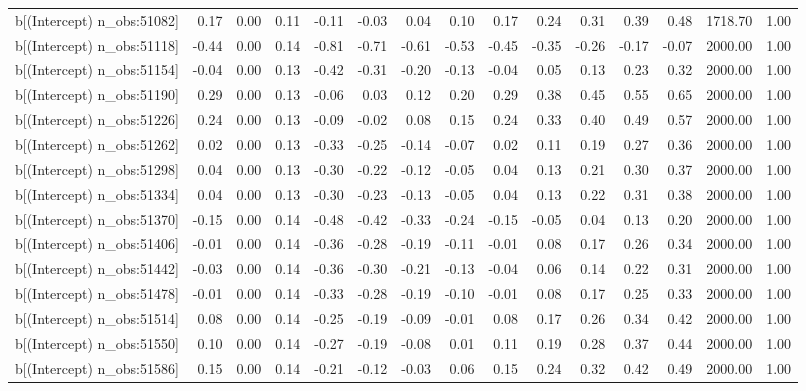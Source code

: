 \begin{table}[ht]
\begin{tabular}{rrrrrrrrrrrrrrr}
  b[(Intercept) n\_obs:51082] & 0.17 & 0.00 & 0.11 & -0.11 & -0.03 & 0.04 & 0.10 & 0.17 & 0.24 & 0.31 & 0.39 & 0.48 & 1718.70 & 1.00 \\ 
  b[(Intercept) n\_obs:51118] & -0.44 & 0.00 & 0.14 & -0.81 & -0.71 & -0.61 & -0.53 & -0.45 & -0.35 & -0.26 & -0.17 & -0.07 & 2000.00 & 1.00 \\ 
  b[(Intercept) n\_obs:51154] & -0.04 & 0.00 & 0.13 & -0.42 & -0.31 & -0.20 & -0.13 & -0.04 & 0.05 & 0.13 & 0.23 & 0.32 & 2000.00 & 1.00 \\ 
  b[(Intercept) n\_obs:51190] & 0.29 & 0.00 & 0.13 & -0.06 & 0.03 & 0.12 & 0.20 & 0.29 & 0.38 & 0.45 & 0.55 & 0.65 & 2000.00 & 1.00 \\ 
  b[(Intercept) n\_obs:51226] & 0.24 & 0.00 & 0.13 & -0.09 & -0.02 & 0.08 & 0.15 & 0.24 & 0.33 & 0.40 & 0.49 & 0.57 & 2000.00 & 1.00 \\ 
  b[(Intercept) n\_obs:51262] & 0.02 & 0.00 & 0.13 & -0.33 & -0.25 & -0.14 & -0.07 & 0.02 & 0.11 & 0.19 & 0.27 & 0.36 & 2000.00 & 1.00 \\ 
  b[(Intercept) n\_obs:51298] & 0.04 & 0.00 & 0.13 & -0.30 & -0.22 & -0.12 & -0.05 & 0.04 & 0.13 & 0.21 & 0.30 & 0.37 & 2000.00 & 1.00 \\ 
  b[(Intercept) n\_obs:51334] & 0.04 & 0.00 & 0.13 & -0.30 & -0.23 & -0.13 & -0.05 & 0.04 & 0.13 & 0.22 & 0.31 & 0.38 & 2000.00 & 1.00 \\ 
  b[(Intercept) n\_obs:51370] & -0.15 & 0.00 & 0.14 & -0.48 & -0.42 & -0.33 & -0.24 & -0.15 & -0.05 & 0.04 & 0.13 & 0.20 & 2000.00 & 1.00 \\ 
  b[(Intercept) n\_obs:51406] & -0.01 & 0.00 & 0.14 & -0.36 & -0.28 & -0.19 & -0.11 & -0.01 & 0.08 & 0.17 & 0.26 & 0.34 & 2000.00 & 1.00 \\ 
  b[(Intercept) n\_obs:51442] & -0.03 & 0.00 & 0.14 & -0.36 & -0.30 & -0.21 & -0.13 & -0.04 & 0.06 & 0.14 & 0.22 & 0.31 & 2000.00 & 1.00 \\ 
  b[(Intercept) n\_obs:51478] & -0.01 & 0.00 & 0.14 & -0.33 & -0.28 & -0.19 & -0.10 & -0.01 & 0.08 & 0.17 & 0.25 & 0.33 & 2000.00 & 1.00 \\ 
  b[(Intercept) n\_obs:51514] & 0.08 & 0.00 & 0.14 & -0.25 & -0.19 & -0.09 & -0.01 & 0.08 & 0.17 & 0.26 & 0.34 & 0.42 & 2000.00 & 1.00 \\ 
  b[(Intercept) n\_obs:51550] & 0.10 & 0.00 & 0.14 & -0.27 & -0.19 & -0.08 & 0.01 & 0.11 & 0.19 & 0.28 & 0.37 & 0.44 & 2000.00 & 1.00 \\ 
  b[(Intercept) n\_obs:51586] & 0.15 & 0.00 & 0.14 & -0.21 & -0.12 & -0.03 & 0.06 & 0.15 & 0.24 & 0.32 & 0.42 & 0.49 & 2000.00 & 1.00 \\ 

\end{tabular}
\end{table}
